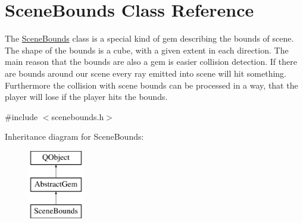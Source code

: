 \hypertarget{class_scene_bounds}{\section{Scene\+Bounds Class Reference}
\label{class_scene_bounds}
}


The \hyperlink{class_scene_bounds}{Scene\+Bounds} class is a special kind of gem describing the bounds of scene. The shape of the bounds is a cube, with a given extent in each direction.  The main reason that the bounds are also a gem is easier collision detection. If there are bounds around our scene every ray emitted into scene will hit something. Furthermore the collision with scene bounds can be processed in a way, that the player will lose if the player hits the bounds.  




{\ttfamily \#include $<$scenebounds.\+h$>$}

Inheritance diagram for Scene\+Bounds\+:\begin{figure}[H]
\begin{center}
\leavevmode
\includegraphics[height=3.000000cm]{class_scene_bounds}
\end{center}
\end{figure}
